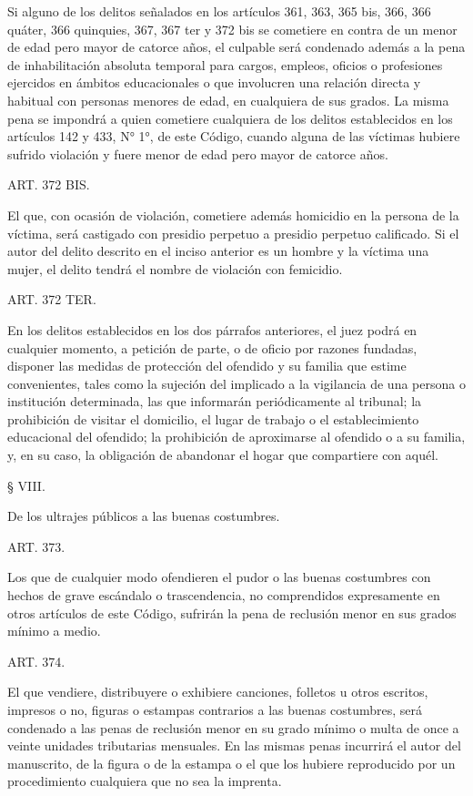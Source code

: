     Si alguno de los delitos señalados en los artículos 361, 363, 365 bis, 366, 366 quáter, 366 quinquies, 367, 367 ter y 372 bis se cometiere en contra de un menor de edad pero mayor de catorce años, el culpable será condenado además a la pena de inhabilitación absoluta temporal para cargos, empleos, oficios o profesiones ejercidos en ámbitos educacionales o que involucren una relación directa y habitual con personas menores de edad, en cualquiera de sus grados. La misma pena se impondrá a quien cometiere cualquiera de los delitos establecidos en los artículos 142 y 433, N° 1°, de este Código, cuando alguna de las víctimas hubiere sufrido violación y fuere menor de edad pero mayor de catorce años.


    ART. 372 BIS.

    El que, con ocasión de violación, cometiere además homicidio en la persona de la víctima, será castigado con presidio perpetuo a presidio perpetuo calificado.
    Si el autor del delito descrito en el inciso anterior es un hombre y la víctima una mujer, el delito tendrá el nombre de violación con femicidio.

    ART. 372 TER.

    En los delitos establecidos en los dos párrafos anteriores, el juez podrá en cualquier momento, a petición de parte, o de oficio por razones fundadas, disponer las medidas de protección del ofendido y su familia que estime convenientes, tales como la sujeción del implicado a la vigilancia de una persona o institución determinada, las que informarán periódicamente al tribunal; la prohibición de visitar el domicilio, el lugar de trabajo o el establecimiento educacional del ofendido; la prohibición de aproximarse al ofendido o a su familia, y, en su caso, la obligación de abandonar el hogar que compartiere con aquél.

    § VIII.

    De los ultrajes públicos a las buenas costumbres.





    ART. 373.

    Los que de cualquier modo ofendieren el pudor o las buenas costumbres con hechos de grave escándalo o trascendencia, no comprendidos expresamente en otros artículos de este Código, sufrirán la pena de reclusión menor en sus grados mínimo a medio.


    ART. 374.

    El que vendiere, distribuyere o exhibiere canciones, folletos u otros escritos, impresos o no, figuras o estampas contrarios a las buenas costumbres, será condenado a las penas de reclusión menor en su grado mínimo o multa de once a veinte unidades tributarias mensuales.
    En las mismas penas incurrirá el autor del manuscrito, de la figura o de la estampa o el que los hubiere reproducido por un procedimiento cualquiera que no sea la imprenta.

